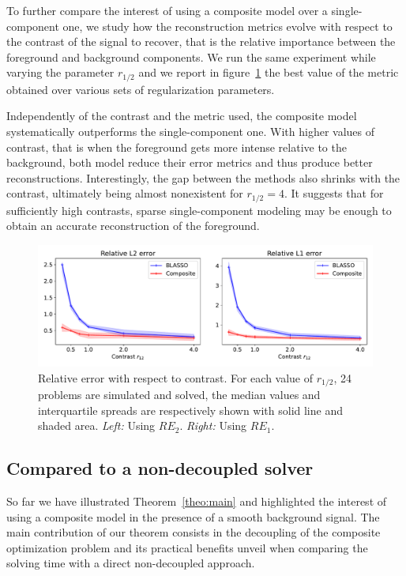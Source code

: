 \documentclass[12pt]{article}
\begin{document}
        To further compare the interest of using a composite model over a single-component one, we study how the reconstruction metrics evolve with respect to the contrast of the signal to recover, that is the relative importance between the foreground and background components. We run the same experiment while varying the parameter $r_{1/2}$ and we report in figure~\ref{fig:bench:metrics-vs-r} the best value of the metric obtained over various sets of regularization parameters.

        Independently of the contrast and the metric used, the composite model systematically outperforms the single-component one. With higher values of contrast, that is when the foreground gets more intense relative to the background, both model reduce their error metrics and thus produce better reconstructions. Interestingly, the gap between the methods also shrinks with the contrast, ultimately being almost nonexistent for $r_{1/2} = 4$. It suggests that for sufficiently high contrasts, sparse single-component modeling may be enough to obtain an accurate reconstruction of the foreground.

        \begin{figure}[t]
            \centering
            \includegraphics[width=\linewidth]{figures/benchmark/error_vs_r12.pdf}        
            \caption{Relative error with respect to contrast. For each value of $r_{1/2}$, 24 problems are simulated and solved, the median values and interquartile spreads are respectively shown with solid line and shaded area. \textit{Left:} Using $RE_2$. \textit{Right:} Using $RE_1$.}
            \label{fig:bench:metrics-vs-r}
        \end{figure}


    \subsection{Compared to a non-decoupled solver}
    \label{sec:bene:deco}
        So far we have illustrated Theorem~\ref{theo:main} and highlighted the interest of using a composite model in the presence of a smooth background signal. The main contribution of our theorem consists in the decoupling of the composite optimization problem and its practical benefits unveil when comparing the solving time with a direct non-decoupled approach. 
\end{document}
